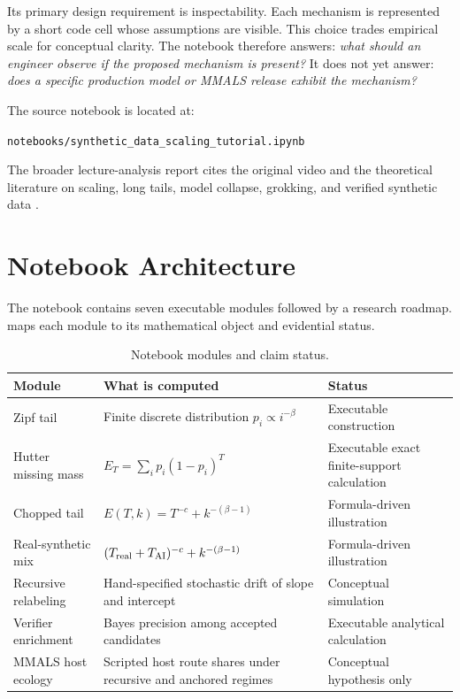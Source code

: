 \documentclass[10pt]{article}
\begin{document}
Its primary design requirement is inspectability. Each mechanism is represented by a short code cell whose assumptions are visible. This choice trades empirical scale for conceptual clarity. The notebook therefore answers: \emph{what should an engineer observe if the proposed mechanism is present?} It does not yet answer: \emph{does a specific production model or MMALS release exhibit the mechanism?}

The source notebook is located at:
\begin{center}
\texttt{notebooks/synthetic\_data\_scaling\_tutorial.ipynb}
\end{center}

The broader lecture-analysis report cites the original video and the theoretical literature on scaling, long tails, model collapse, grokking, and verified synthetic data \citep{kempevideo2024,hutter2021learning,dohmatob2024tails,dohmatob2024regression,feng2025verification}.

\section{Notebook Architecture}

The notebook contains seven executable modules followed by a research roadmap.  maps each module to its mathematical object and evidential status.

\begin{table}[H]
\centering
\small
\caption{Notebook modules and claim status.}
\label{tab:modules}
\begin{tabularx}{\textwidth}{p{2.5cm} X p{3.0cm}}
\toprule
\textbf{Module} & \textbf{What is computed} & \textbf{Status} \\
\midrule
Zipf tail & Finite discrete distribution $p_i\propto i^{-\beta}$ & Executable construction \\
Hutter missing mass & $E_T=\sum_i p_i(1-p_i)^T$ & Executable exact finite-support calculation \\
Chopped tail & $E(T,k)=T^{-c}+k^{-(\beta-1)}$ & Formula-driven illustration \\
Real-synthetic mix & $(T_{\rm real}+T_{\rm AI})^{-c}+k^{-(\beta-1)}$ & Formula-driven illustration \\
Recursive relabeling & Hand-specified stochastic drift of slope and intercept & Conceptual simulation \\
Verifier enrichment & Bayes precision among accepted candidates & Executable analytical calculation \\
MMALS host ecology & Scripted host route shares under recursive and anchored regimes & Conceptual hypothesis only \\
\bottomrule
\end{tabularx}
\end{table}
\end{document}
